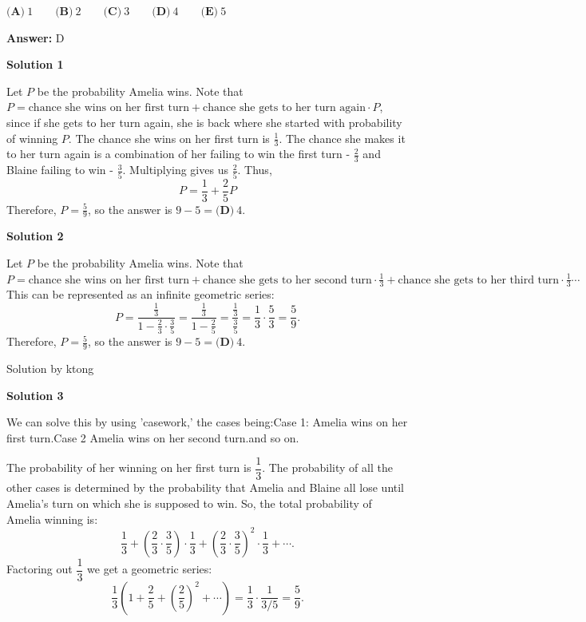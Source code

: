 \begin{enumerate}
 $\textbf{(A)}\ 1\qquad\textbf{(B)}\ 2\qquad\textbf{(C)}\ 3\qquad\textbf{(D)}\ 4\qquad\textbf{(E)}\ 5$

 \textbf{Answer: }D



\textbf{Solution 1}

Let $P$ be the probability Amelia wins. Note that $P = \text{chance she wins on her first turn} + \text{chance she gets to her turn again}\cdot P$, since if she gets to her turn again, she is back where she started with probability of winning $P$. The chance she wins on her first turn is $\frac{1}{3}$. The chance she makes it to her turn again is a combination of her failing to win the first turn - $\frac{2}{3}$ and Blaine failing to win - $\frac{3}{5}$. Multiplying gives us $\frac{2}{5}$. Thus,
 \[P = \frac{1}{3} + \frac{2}{5}P\]Therefore, $P = \frac{5}{9}$, so the answer is $9-5=\boxed{\textbf{(D)}\ 4}$.

 



\textbf{Solution 2}

Let $P$ be the probability Amelia wins. Note that $P = \text{chance she wins on her first turn} + \text{chance she gets to her second turn}\cdot \frac{1}{3} + \text{chance she gets to her third turn}\cdot \frac{1}{3} \cdots$ This can be represented as an infinite geometric series: 
 \[P=\frac{\frac{1}{3}}{1-\frac{2}{3}\cdot \frac{3}{5}} = \frac{\frac{1}{3}}{1-\frac{2}{5}} = \frac{\frac{1}{3}}{\frac{3}{5}} = \frac{1}{3}\cdot \frac{5}{3} = \frac{5}{9}.\] Therefore, $P = \frac{5}{9}$, so the answer is $9-5 = \boxed{\textbf{(D)}\ 4}.$

 Solution by ktong

 



\textbf{Solution 3}

We can solve this by using 'casework,' the cases being:Case 1: Amelia wins on her first turn.Case 2 Amelia wins on her second turn.and so on.

 The probability of her winning on her first turn is $\dfrac13$. The probability of all the other cases is determined by the probability that Amelia and Blaine all lose until Amelia's turn on which she is supposed to win. So, the total probability of Amelia winning is:
 \[\dfrac{1}{3}+\left(\dfrac{2}{3}\cdot\dfrac{3}{5}\right)\cdot\dfrac{1}{3}+\left(\dfrac{2}{3}\cdot\dfrac{3}{5}\right)^2\cdot\dfrac{1}{3}+\cdots.\]Factoring out $\dfrac13$ we get a geometric series:
 \[\dfrac{1}{3}\left(1+\dfrac{2}{5}+\left(\dfrac{2}{5}\right)^2+\cdots\right) = \dfrac{1}{3}\cdot\dfrac{1}{3/5} = \boxed{\dfrac59}.\]


\end{enumerate}
